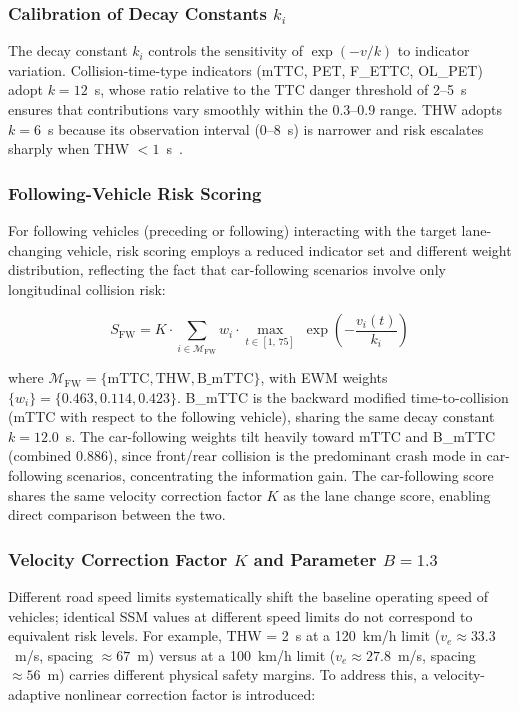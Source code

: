 \documentclass[preprint,review,12pt,a4paper]{elsarticle}
\begin{document}
\subsubsection{Calibration of Decay Constants $k_i$}

The decay constant $k_i$ controls the sensitivity of $\exp(-v/k)$ to indicator variation. Collision-time-type indicators (mTTC, PET, F\_ETTC, OL\_PET) adopt $k = 12$~s, whose ratio relative to the TTC danger threshold of 2--5~s~\cite{C06} ensures that contributions vary smoothly within the 0.3--0.9 range. THW adopts $k = 6$~s because its observation interval (0--8~s) is narrower and risk escalates sharply when THW $< 1$~s~\cite{C18}.

\subsubsection{Following-Vehicle Risk Scoring}

For following vehicles (preceding or following) interacting with the target lane-changing vehicle, risk scoring employs a reduced indicator set and different weight distribution, reflecting the fact that car-following scenarios involve only longitudinal collision risk:

\begin{equation}
S_{\text{FW}} = K \cdot \sum_{i \in \mathcal{M}_{\text{FW}}} w_i \cdot \max_{t \in [1,\,75]}\;\exp\!\left(-\frac{v_i(t)}{k_i}\right)
\end{equation}

where $\mathcal{M}_{\text{FW}} = \{\text{mTTC}, \text{THW}, \text{B\_mTTC}\}$, with EWM weights $\{w_i\} = \{0.463, 0.114, 0.423\}$. B\_mTTC is the backward modified time-to-collision (mTTC with respect to the following vehicle), sharing the same decay constant $k = 12.0$~s. The car-following weights tilt heavily toward mTTC and B\_mTTC (combined 0.886), since front/rear collision is the predominant crash mode in car-following scenarios, concentrating the information gain. The car-following score shares the same velocity correction factor $K$ as the lane change score, enabling direct comparison between the two.

\subsubsection{Velocity Correction Factor $K$ and Parameter $B = 1.3$}

Different road speed limits systematically shift the baseline operating speed of vehicles; identical SSM values at different speed limits do not correspond to equivalent risk levels. For example, THW = 2~s at a 120~km/h limit ($v_e \approx 33.3$~m/s, spacing $\approx 67$~m) versus at a 100~km/h limit ($v_e \approx 27.8$~m/s, spacing $\approx 56$~m) carries different physical safety margins. To address this, a velocity-adaptive nonlinear correction factor is introduced:
\end{document}
